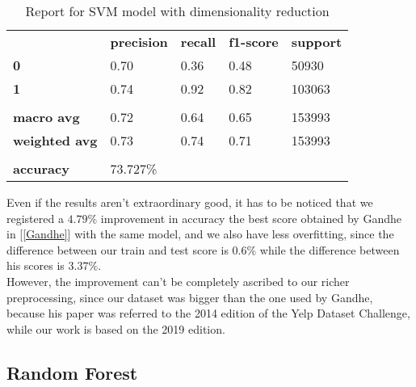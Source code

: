 \begin{table}[h]
    \centering
    \begin{tabular}{lllll}
        \rowcolor[HTML]{EEEEEE} 
        \cellcolor[HTML]{FBFBFB} & \textbf{precision} & \textbf{recall} & \textbf{f1-score} & \textbf{support} \\
        \rowcolor[HTML]{EEEEEE} 
        \textbf{0}               & 0.70               & 0.36            & 0.48              & 50930            \\
        \rowcolor[HTML]{EEEEEE} 
        \textbf{1}               & 0.74               & 0.92            & 0.82              & 103063           \\
        \rowcolor[HTML]{FBFBFB} 
        &                    &                 &                   &                  \\
        \rowcolor[HTML]{EEEEEE} 
        \textbf{macro avg}       & 0.72               & 0.64            & 0.65              & 153993           \\
        \rowcolor[HTML]{EEEEEE} 
        \textbf{weighted avg}    & 0.73               & 0.74            & 0.71              & 153993           \\
        \rowcolor[HTML]{FBFBFB} 
        &                    &                 &                   &                  \\
        \rowcolor[HTML]{EEEEEE} 
        \textbf{accuracy}        & \multicolumn{4}{l}{\cellcolor[HTML]{EEEEEE}73.727\%}                         
    \end{tabular}
    \caption{Report for SVM model with dimensionality reduction}
    \label{tab:svm-res-1}
\end{table}

Even if the results aren't extraordinary good, it has to be noticed that we registered a $4.79‬\%$ improvement in accuracy \wrt the best score obtained by Gandhe in [\ref{Gandhe}] with the same model, and we also have less overfitting, since the difference between our train and test score is $0.6\%$ while the difference between his scores is $3.37\%$.\\
However, the improvement can't be completely ascribed to our richer preprocessing, since our dataset was bigger than the one used by Gandhe, because his paper was referred to the 2014 edition of the Yelp Dataset Challenge, while our work is based on the 2019 edition.


\subsection{Random Forest}

